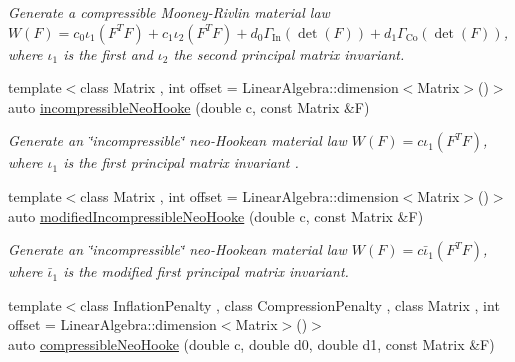 \begin{DoxyCompactItemize}
\begin{DoxyCompactList}\small\item\em Generate a compressible Mooney-\/\-Rivlin material law $ W(F)=c_0\iota_1(F^T F) + c_1\iota_2(F^T F) + d_0\Gamma_\mathrm{In}(\det(F))+d_1\Gamma_\mathrm{Co}(\det(F)) $, where $\iota_1$ is the first and $\iota_2$ the second principal matrix invariant. \end{DoxyCompactList}\item 
\hypertarget{group__Rubber_ga5bb28aef7006413775791998936d6b81}{{\footnotesize template$<$class Matrix , int offset = Linear\-Algebra\-::dimension$<$\-Matrix$>$()$>$ }\\auto \hyperlink{group__Rubber_ga5bb28aef7006413775791998936d6b81}{incompressible\-Neo\-Hooke} (double c, const Matrix \&F)}\label{group__Rubber_ga5bb28aef7006413775791998936d6b81}

\begin{DoxyCompactList}\small\item\em Generate an \char`\"{}incompressible\char`\"{} neo-\/\-Hookean material law $ W(F)=c\iota_1(F^T F) $, where $\iota_1$ is the first principal matrix invariant . \end{DoxyCompactList}\item 
\hypertarget{group__Rubber_gaf6f5ab6a379ef03d513acc5042731a01}{{\footnotesize template$<$class Matrix , int offset = Linear\-Algebra\-::dimension$<$\-Matrix$>$()$>$ }\\auto \hyperlink{group__Rubber_gaf6f5ab6a379ef03d513acc5042731a01}{modified\-Incompressible\-Neo\-Hooke} (double c, const Matrix \&F)}\label{group__Rubber_gaf6f5ab6a379ef03d513acc5042731a01}

\begin{DoxyCompactList}\small\item\em Generate an \char`\"{}incompressible\char`\"{} neo-\/\-Hookean material law $ W(F)=c\bar\iota_1(F^T F) $, where $\bar\iota_1$ is the modified first principal matrix invariant. \end{DoxyCompactList}\item 
\hypertarget{group__Rubber_gac5c39cd9de55f4f0220a806cf28a7b30}{{\footnotesize template$<$class Inflation\-Penalty , class Compression\-Penalty , class Matrix , int offset = Linear\-Algebra\-::dimension$<$\-Matrix$>$()$>$ }\\auto \hyperlink{group__Rubber_gac5c39cd9de55f4f0220a806cf28a7b30}{compressible\-Neo\-Hooke} (double c, double d0, double d1, const Matrix \&F)}\label{group__Rubber_gac5c39cd9de55f4f0220a806cf28a7b30}


\end{DoxyCompactItemize}
